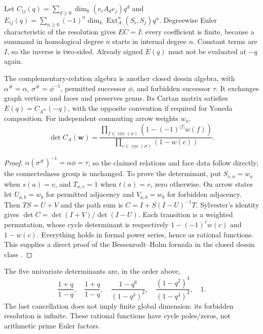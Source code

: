 Let $C_{ij}(q)=\sum_{d\ge0}\dim_k(e_iA_de_j)q^d$ and $E_{ij}(q)=\sum_{n\ge0}(-1)^n\dim_k\operatorname{Ext}_A^n(S_i,S_j)q^n$. Degreewise Euler characteristic of the resolution gives $EC=I$: every coefficient is finite, because a summand in homological degree $n$ starts in internal degree $n$. Constant terms are $I$, so the inverse is two-sided. Already signed $E(q)$ must not be evaluated at $-q$ again.

\begin{proposition}\label{thm:cartan}
The complementary-relation algebra is another closed dessin algebra, with $\alpha^\#=\alpha$, $\sigma^\#=\phi^{-1}$, permitted successor $\phi$, and forbidden successor $\tau$. It exchanges graph vertices and faces and preserves genus. Its Cartan matrix satisfies $E(q)=C_{A^\#}(-q)$, with the opposite convention if required for Yoneda composition. For independent commuting arrow weights $w_a$,
\[
 \det C_A(\mathbf w)=
 \frac{\prod_{f\in\operatorname{cyc}(\phi)}(1-(-1)^{|f|}w(f))}
 {\prod_{c\in\operatorname{cyc}(\sigma)}(1-w(c))}.
\]
\end{proposition}
\begin{proof}
$\alpha(\sigma^\#)^{-1}=\alpha\phi=\tau$, so the claimed relations and face data follow directly; the connectedness group is unchanged. To prove the determinant, put $S_{v,a}=w_a$ when $s(a)=v$, and $T_{a,v}=1$ when $t(a)=v$, zero otherwise. On arrow states let $U_{a,b}=w_b$ for permitted adjacency and $V_{a,b}=w_b$ for forbidden adjacency. Then $TS=U+V$ and the path sum is $C=I+S(I-U)^{-1}T$. Sylvester's identity gives $\det C=\det(I+V)/\det(I-U)$. Each transition is a weighted permutation, whose cycle determinant is respectively $1-(-1)^\ell w(c)$ and $1-w(c)$. Everything holds in formal power series, hence as rational functions. This supplies a direct proof of the Bessenrodt--Holm formula in the closed dessin class \cite{BessenrodtHolm}.
\end{proof}
The five univariate determinants are, in the order above,
\[
 \frac{1+q}{1-q},\quad\frac{1+q}{1-q},\quad
 \frac{1-q^6}{(1-q^3)^2},\quad
 \frac{(1-q^2)^3}{(1-q^3)^2},\quad 1.
\]
The last cancellation does not imply finite global dimension: its forbidden resolution is infinite. These rational functions have cycle poles/zeros, not arithmetic prime Euler factors.

